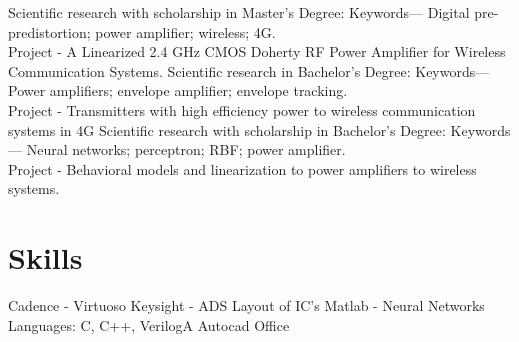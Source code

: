 \documentclass[]{cv-style}          %
\begin{document}
\begin{entrylist}
	\entry
	{}
	{Scientific research with scholarship in Master's Degree:}
	{\vspace{-0.01cm}}
	{Keywords— Digital pre-predistortion; power amplifier; wireless; 4G.\\
		Project - A Linearized 2.4 GHz CMOS Doherty RF Power Amplifier for Wireless Communication Systems.}
	{}
	\entry
	{}
	{Scientific research in Bachelor's Degree:}
	{\vspace{-0.01cm}}
	{Keywords— Power amplifiers; envelope amplifier; envelope tracking.\\
		Project -  Transmitters with high efficiency power to wireless communication systems in 4G}
	{}
	\entry
	{}
	{Scientific research with scholarship in Bachelor's Degree:}
	{\vspace{-0.01cm}}
	{Keywords— Neural networks; perceptron; RBF; power amplifier.\\
		Project - Behavioral models and linearization to power amplifiers to wireless systems.}
	{}
\end{entrylist}
{\vspace{-0.6cm}}
\section{Skills}

\begin{entrylist}
	\entry
	{}
	{Cadence - Virtuoso}
	{}
	{\vspace{-0.4cm}}
	\entry
	{}
	{Keysight - ADS}
	{}
	{\vspace{-0.4cm}}
	\entry
	{}
	{Layout of IC's}
	{}
	{\vspace{-0.4cm}}
	\entry
	{}
	{Matlab - Neural Networks}
	{}
	{\vspace{-0.4cm}}
	\entry
	{}
	{Languages: C, C++, VerilogA}
	{}
	{\vspace{-0.4cm}}
	\entry
	{}
	{Autocad}
	{}
	{\vspace{-0.4cm}}
	\entry
	{}
	{Office}
	{}

\end{entrylist}
{\vspace{-0.4cm}}
\end{document}
